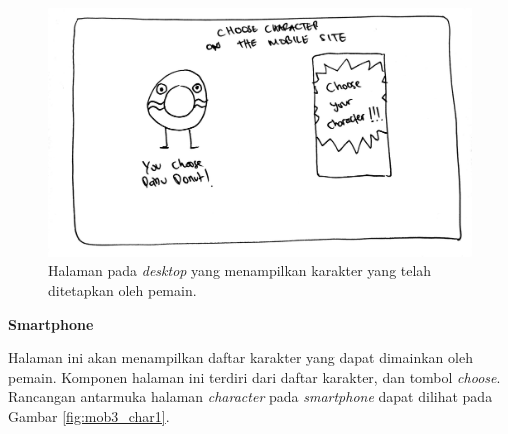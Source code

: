 \begin{enumerate}
\begin{figure}[H]
	\centering
	\includegraphics[scale=0.1]{Gambar/web3_char}
	\caption{Halaman pada \textit{desktop} yang menampilkan karakter yang telah ditetapkan oleh pemain.}
	\label{fig:web3_char}
\end{figure}


	\textbf{Smartphone}
	
	Halaman ini akan menampilkan daftar karakter yang dapat dimainkan oleh pemain. Komponen halaman ini terdiri dari daftar karakter, dan tombol \textit{choose}. Rancangan antarmuka halaman \textit{character} pada \textit{smartphone} dapat dilihat pada Gambar \ref{fig:mob3_char1}.
	

\end{enumerate}
